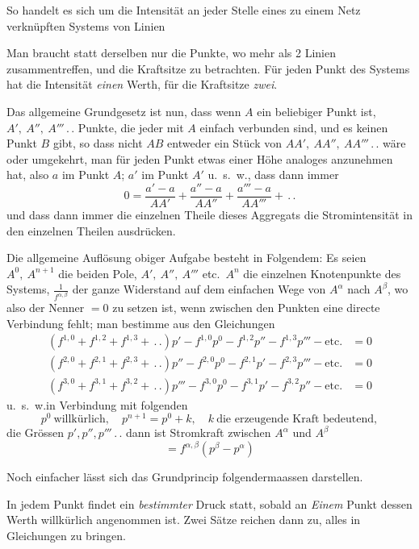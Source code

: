 So handelt es sich um die Intensität an jeder Stelle eines zu einem Netz verknüpften Systems von Linien
\begin{center}\resizebox{.63\linewidth}{!}{}\end{center}
Man braucht statt derselben nur die Punkte, wo mehr als 2 Linien zusammentreffen, und die Kraftsitze zu betrachten. Für jeden Punkt des Systems hat die Intensität \textit{einen} Werth, für die Kraftsitze \textit{zwei}.

Das allgemeine Grundgesetz ist nun, dass wenn $A$ ein beliebiger Punkt ist, $A',\ A'',\ A'''\,.\,.$ Punkte, die jeder mit $A$ einfach verbunden sind, und es keinen Punkt $B$ gibt, so dass nicht $AB$ entweder ein Stück von $AA',\ AA'',\ AA'''\,.\,.$ wäre oder umgekehrt, man für jeden Punkt etwas einer Höhe analoges anzunehmen hat, also $a$ im Punkt $A$; $a'$ im Punkt $A'$ u.\ s.\ w., dass dann immer
\[
0=\frac{a'-a}{AA'}+\frac{a''-a}{AA''}+\frac{a'''-a}{AA'''}+\,.\,.
\]
und dass dann immer die einzelnen Theile dieses Aggregats die Stromintensität in den einzelnen Theilen ausdrücken.

\vspace{3mm}
Die allgemeine Auflösung obiger Aufgabe besteht in Folgendem: Es seien $A^0,\ A^{n+1}$ die beiden Pole, $A',\ A'',\ A'''$ etc.\ $A^n$ die einzelnen Knotenpunkte des Systems, $\frac{1}{f^{\alpha,\beta}}$ der ganze Widerstand auf dem einfachen Wege von $A^\alpha$ nach $A^\beta$, wo also der Nenner $=0$ zu setzen ist, wenn zwischen den Punkten eine directe Verbindung fehlt; man bestimme aus den Gleichungen
\[
\begin{aligned}
(f^{1,0}+f^{1,2}+f^{1,3}+\,.\,.)p'-f^{1,0}p^0-f^{1,2}p''-f^{1,3}p'''-\text{etc.}&=0\\
(f^{2,0}+f^{2,1}+f^{2,3}+\,.\,.)p''-f^{2,0}p^0-f^{2,1}p'-f^{2,3}p'''-\text{etc.}&=0\\
(f^{3,0}+f^{3,1}+f^{3,2}+\,.\,.)p'''-f^{3,0}p^0-f^{3,1}p'-f^{3,2}p''-\text{etc.}&=0
\end{aligned}
\]
u.\ s.\ w.\quad in Verbindung mit folgenden
\[
p^0\ \text{willkürlich},\quad p^{n+1}=p^0+k,\quad k\ \text{die erzeugende Kraft bedeutend},
\]
die Grössen $p',p'',p'''\,.\,.$ dann ist Stromkraft zwischen $A^\alpha$ und $A^\beta$
\[
=f^{\alpha,\beta}(p^\beta-p^\alpha)
\]

\vspace{3mm}
Noch einfacher lässt sich das Grundprincip folgendermaassen darstellen.

In jedem Punkt findet ein \textit{bestimmter} Druck statt, sobald an \textit{Einem} Punkt dessen Werth willkürlich angenommen ist. Zwei Sätze reichen dann zu, alles in Gleichungen zu bringen.

